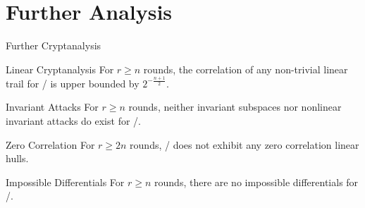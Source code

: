 \section{Further Analysis}
\begin{frame}{Further Cryptanalysis}
    \begin{minipage}[t][70pt][t]{0.47\textwidth}
        \begin{block}{Linear Cryptanalysis\vpPp}
            For $r \geqslant n$ rounds, the correlation of any non-trivial linear trail for \bison/ is upper bounded by $2^{-\frac{n+1}{2}}$.
        \end{block}
    \end{minipage}
    \hfill
    \begin{minipage}[t][70pt][t]{0.47\textwidth}
        \begin{block}{Invariant Attacks\vpPp}
            For $r \geqslant n$ rounds, neither invariant subspaces nor nonlinear invariant attacks do exist for \bison/.
            \vspace{3pt}
        \end{block}
    \end{minipage}

    \begin{minipage}[t][70pt][t]{0.47\textwidth}
        \begin{block}{Zero Correlation\vpPp}
            For $r \geqslant 2n$ rounds, \bison/ does not exhibit any zero correlation linear hulls.
        \end{block}
    \end{minipage}
    \hfill
    \begin{minipage}[t][70pt][t]{0.47\textwidth}
        \begin{block}{Impossible Differentials\vpPp}
            For $r \geqslant n$ rounds, there are no impossible differentials for \bison/.
        \end{block}
    \end{minipage}
\end{frame}

